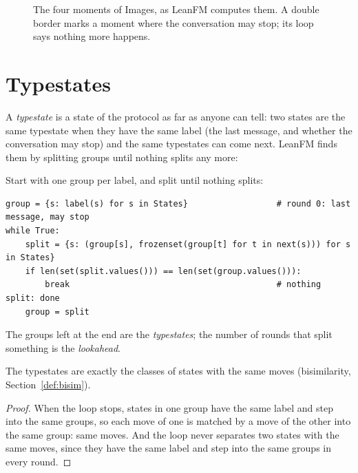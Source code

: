 \begin{figure}[ht]
\centering
{}
\caption{The four moments of Images, as LeanFM computes them. A double border marks a moment where the conversation may stop; its loop says nothing more happens.}
\label{fig:images-ts}
\end{figure}

\section{Typestates}

A \emph{typestate} is a state of the protocol as far as anyone can tell: two states are the
same typestate when they have the same label (the last message, and whether the conversation
may stop) and the same typestates can come next. LeanFM finds them by splitting groups until
nothing splits any more:

\begin{definition}\label{def:rounds}
Start with one group per label, and split until nothing splits:
\begin{lstlisting}[language={},basicstyle=\ttfamily\footnotesize]
group = {s: label(s) for s in States}                  # round 0: last message, may stop
while True:
    split = {s: (group[s], frozenset(group[t] for t in next(s))) for s in States}
    if len(set(split.values())) == len(set(group.values())):
        break                                          # nothing split: done
    group = split
\end{lstlisting}
The groups left at the end are the \emph{typestates}; the number of rounds that split
something is the \emph{lookahead}.
\end{definition}

\begin{lemma}\label{lem:rounds}
The typestates are exactly the classes of states with the same moves (bisimilarity,
Section~\ref{def:bisim}).
\end{lemma}

\begin{proof}
When the loop stops, states in one group have the same label and step into the same groups,
so each move of one is matched by a move of the other into the same group: same moves. And
the loop never separates two states with the same moves, since they have the same label and
step into the same groups in every round.
\end{proof}


